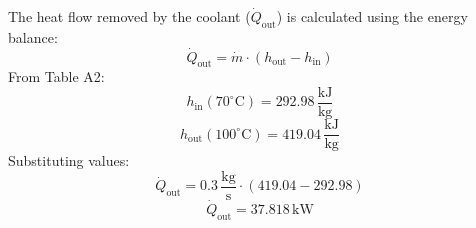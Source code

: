 The heat flow removed by the coolant (\( \dot{Q}_{\text{out}} \)) is calculated using the energy balance:  
\[
\dot{Q}_{\text{out}} = \dot{m} \cdot (h_{\text{out}} - h_{\text{in}})
\]  
From Table A2:  
\[
h_{\text{in}}(70^\circ\text{C}) = 292.98 \, \frac{\text{kJ}}{\text{kg}}
\]  
\[
h_{\text{out}}(100^\circ\text{C}) = 419.04 \, \frac{\text{kJ}}{\text{kg}}
\]  
Substituting values:  
\[
\dot{Q}_{\text{out}} = 0.3 \, \frac{\text{kg}}{\text{s}} \cdot (419.04 - 292.98)
\]  
\[
\dot{Q}_{\text{out}} = 37.818 \, \text{kW}
\]